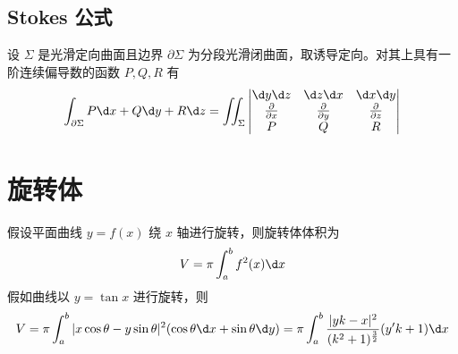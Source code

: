 \subsection{Stokes 公式}

\begin{theorem}[Stokes 公式]
	设 $\Sigma$ 是光滑定向曲面且边界 $\partial \Sigma$ 为分段光滑闭曲面，取诱导定向。对其上具有一阶连续偏导数的函数 $P, Q, R$ 有
	\[ \int_{\partial \Sigma} P \d x + Q \d y + R \d z = \iint_\Sigma \left| \begin{matrix}
			\d y \d z                   & \d z \d x                   & \d x \d y                   \\
			\frac{\partial}{\partial x} & \frac{\partial}{\partial y} & \frac{\partial}{\partial z} \\
			P                           & Q                           & R
		\end{matrix} \right| \]
\end{theorem}

\section{旋转体}

假设平面曲线 $y = f(x)$ 绕 $x$ 轴进行旋转，则旋转体体积为
\[ V = \pi \int_a^b f^2(x) \d x \]
假如曲线以 $y = \tan x$ 进行旋转，则
\[ V = \pi \int_a^b |x \cos \theta - y \sin \theta|^2(\cos \theta \d x + \sin \theta \d y) = \pi \int_a^b \frac{|yk-x|^2}{(k^2+1)^{\frac{3}{2}}}(y'k+1) \d x \]


